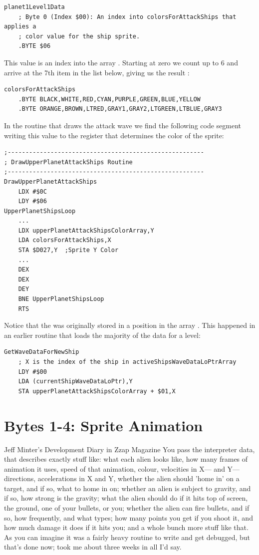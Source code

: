 \begin{lstlisting}
planet1Level1Data
    ; Byte 0 (Index $00): An index into colorsForAttackShips that applies a
    ; color value for the ship sprite.
    .BYTE $06
\end{lstlisting}

This value is an index into the array . Starting at zero we count up to 6
and arrive at the 7th item in the list below, giving us the result :
\begin{lstlisting}
colorsForAttackShips
    .BYTE BLACK,WHITE,RED,CYAN,PURPLE,GREEN,BLUE,YELLOW
    .BYTE ORANGE,BROWN,LTRED,GRAY1,GRAY2,LTGREEN,LTBLUE,GRAY3
\end{lstlisting}

In the routine that draws the attack wave we find the following code segment writing this value
to the register  that determines the color of the sprite:

\begin{lstlisting}
;-------------------------------------------------------
; DrawUpperPlanetAttackShips Routine
;-------------------------------------------------------
DrawUpperPlanetAttackShips
    LDX #$0C
    LDY #$06
UpperPlanetShipsLoop   
    ...
    LDX upperPlanetAttackShipsColorArray,Y
    LDA colorsForAttackShips,X
    STA $D027,Y  ;Sprite Y Color
    ...
    DEX
    DEX
    DEY
    BNE UpperPlanetShipsLoop
    RTS
\end{lstlisting}

Notice that the  was originally stored in a position in the array .
This happened in an earlier routine that loads the majority of the data for a level:


\begin{lstlisting}
GetWaveDataForNewShip
    ; X is the index of the ship in activeShipsWaveDataLoPtrArray
    LDY #$00
    LDA (currentShipWaveDataLoPtr),Y
    STA upperPlanetAttackShipsColorArray + $01,X
\end{lstlisting}

\section{Bytes 1-4: Sprite Animation}
\begin{q}{Jeff Minter's Development Diary in Zzap Magazine\cite{planner}}
You pass the interpreter data, that describes exactly stuff like: what each
alien looks like, how many frames of animation it uses, speed of that
animation, colour, velocities in X— and Y— directions, accelerations in X and
Y, whether the alien should 'home in' on a target, and if so, what to home in
on; whether an alien is subject to gravity, and if so, how strong is the
gravity; what the alien should do if it hits top of screen, the ground, one of
your bullets, or you; whether the alien can fire bullets, and if so, how
frequently, and what types; how many points you get if you shoot it, and how
much damage it does if it hits you; and a whole bunch more stuff like that. As
you can imagine it was a fairly heavy routine to write and get debugged, but
that's done now; took me about three weeks in all I'd say.
\end{q}

